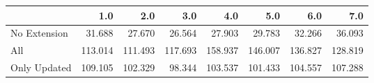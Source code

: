 \begin{tabular}{lrrrrrrr}
\toprule
{} &     1.0 &     2.0 &     3.0 &     4.0 &     5.0 &     6.0 &     7.0 \\
\midrule
No Extension &  31.688 &  27.670 &  26.564 &  27.903 &  29.783 &  32.266 &  36.093 \\
All          & 113.014 & 111.493 & 117.693 & 158.937 & 146.007 & 136.827 & 128.819 \\
Only Updated & 109.105 & 102.329 &  98.344 & 103.537 & 101.433 & 104.557 & 107.288 \\
\bottomrule
\end{tabular}
